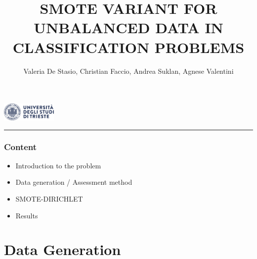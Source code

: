 \documentclass{beamer}
\title[SMOTE-DIRICHLET]{\LARGE SMOTE VARIANT FOR UNBALANCED DATA IN CLASSIFICATION PROBLEMS}
\author[De Stasio, Faccio, Suklan, Valentini]{\small Valeria De Stasio, Christian Faccio, Andrea Suklan, Agnese Valentini}
\begin{document}
\begin{frame}
  \centering
  \includegraphics[width=0.2\textwidth]{figures/logo.png} \\
  \rule{0.5\linewidth}{0.3pt}
  \titlepage
\end{frame}

\begin{frame}
  \frametitle{Content}
  \begin{itemize}
    \item Introduction to the problem
    \item Data generation / Assessment method 
    \item SMOTE-DIRICHLET
    \item Results
  \end{itemize}
\end{frame}





\section{Data Generation}
\end{document}
